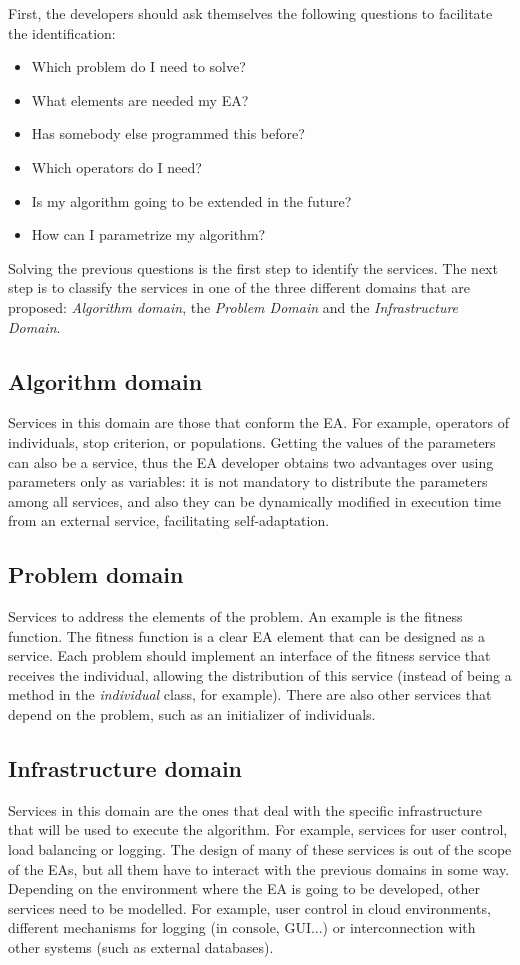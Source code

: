 First, the developers should ask themselves the following questions to facilitate the identification:
\begin{itemize}
\item Which problem do I need to solve?
\item What elements are needed my EA?
\item Has somebody else programmed this before?
\item Which operators do I need?
\item Is my algorithm going to be extended in the future?
\item How can I parametrize my algorithm?
\end{itemize}

Solving the previous questions is the first step to identify the services. The next step is to classify the services in one of the three different domains that are proposed: {\em Algorithm domain}, the {\em Problem Domain} and the {\em Infrastructure Domain}. 

\subsection{Algorithm domain} Services in this domain are those that conform the EA. For example, operators of individuals, stop criterion, or populations.
 Getting the values of the parameters can also be a
  service,  thus the EA developer obtains two advantages over using parameters only as variables: 
it is not mandatory to distribute the parameters among all services, and also they can be dynamically modified in execution time from an external service, facilitating self-adaptation.

\subsection{Problem domain} Services to address the elements of the problem. An example is the fitness function. The fitness function is a clear EA element that can be designed as a service. Each problem should implement an interface
  of the fitness service that receives the individual, allowing the
  distribution of this service (instead of being a method in the {\em individual} class, for example). There are also other services that depend on the problem, such as an initializer of individuals.

\subsection{Infrastructure domain} Services in this domain are the ones that deal with the specific infrastructure that will be used to execute the algorithm. For example, services for user control, load balancing or logging. The design of many of these services is out of the scope of the EAs, but all them have to interact with the previous domains in some way. Depending on the environment where the EA is going to be developed, other services need to be modelled. For example, user control in cloud environments, different mechanisms for logging (in console, GUI...) or interconnection with other systems (such as external databases).

